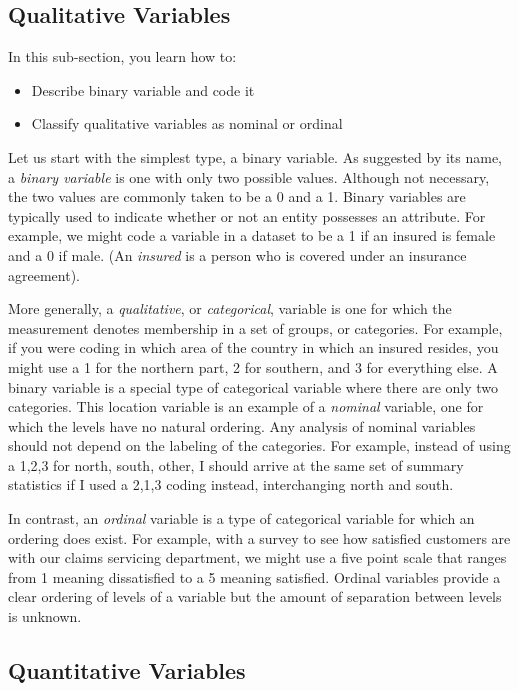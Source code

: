 \documentclass[]{book}
\providecommand{\tightlist}{%
  \setlength{\itemsep}{0pt}\setlength{\parskip}{0pt}}
\theoremstyle{definition}
\theoremstyle{definition}
\theoremstyle{definition}
\theoremstyle{remark}
\begin{document}
\subsection{Qualitative Variables}\label{S:QuaVar}

In this sub-section, you learn how to:

\begin{itemize}
\tightlist
\item
  Describe binary variable and code it
\item
  Classify qualitative variables as nominal or ordinal
\end{itemize}

Let us start with the simplest type, a binary variable. As suggested by
its name, a \emph{binary variable} is one with only two possible values.
Although not necessary, the two values are commonly taken to be a 0 and
a 1. Binary variables are typically used to indicate whether or not an
entity possesses an attribute. For example, we might code a variable in
a dataset to be a 1 if an insured is female and a 0 if male. (An
\emph{insured} is a person who is covered under an insurance agreement).

More generally, a \emph{qualitative}, or \emph{categorical}, variable is
one for which the measurement denotes membership in a set of groups, or
categories. For example, if you were coding in which area of the country
in which an insured resides, you might use a 1 for the northern part, 2
for southern, and 3 for everything else. A binary variable is a special
type of categorical variable where there are only two categories. This
location variable is an example of a \emph{nominal} variable, one for
which the levels have no natural ordering. Any analysis of nominal
variables should not depend on the labeling of the categories. For
example, instead of using a 1,2,3 for north, south, other, I should
arrive at the same set of summary statistics if I used a 2,1,3 coding
instead, interchanging north and south.

In contrast, an \emph{ordinal} variable is a type of categorical
variable for which an ordering does exist. For example, with a survey to
see how satisfied customers are with our claims servicing department, we
might use a five point scale that ranges from 1 meaning dissatisfied to
a 5 meaning satisfied. Ordinal variables provide a clear ordering of
levels of a variable but the amount of separation between levels is
unknown.

\subsection{Quantitative Variables}\label{S:QuanVar}
\end{document}
